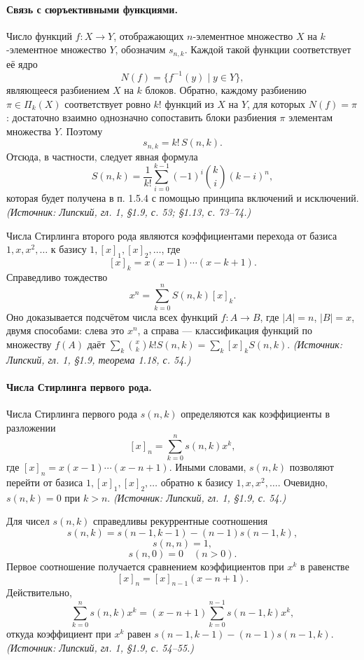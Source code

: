\documentclass[a4paper,12pt]{article}
\begin{document}
\paragraph{Связь с сюръективными функциями.}
Число функций \(f:X\to Y\), отображающих \(n\)-элементное множество \(X\) на \(k\)-элементное множество \(Y\), обозначим \(s_{n,k}\). Каждой такой функции соответствует её ядро
\[
N(f)=\{f^{-1}(y)\mid y\in Y\},
\]
являющееся разбиением \(X\) на \(k\) блоков. Обратно, каждому разбиению \(\pi\in\Pi_k(X)\) соответствует ровно \(k!\) функций из \(X\) на \(Y\), для которых \(N(f)=\pi\): достаточно взаимно однозначно сопоставить блоки разбиения \(\pi\) элементам множества \(Y\). Поэтому
\[
s_{n,k}=k!\,S(n,k).
\]
Отсюда, в частности, следует явная формула
\[
S(n,k)=\frac{1}{k!}\sum_{i=0}^{k-1}(-1)^i\binom{k}{i}(k-i)^n,
\]
которая будет получена в п. 1.5.4 с помощью принципа включений и исключений.
\textit{(Источник: Липский, гл. 1, §1.9, с. 53; §1.13, с. 73--74.)}

Числа Стирлинга второго рода являются коэффициентами перехода от базиса \(1,x,x^2,\dots\) к базису \(1,[x]_1,[x]_2,\dots\), где
\[
[x]_k=x(x-1)\cdots(x-k+1).
\]
Справедливо тождество
\[
x^n=\sum_{k=0}^{n}S(n,k)[x]_k.
\]
Оно доказывается подсчётом числа всех функций \(f:A\to B\), где \(|A|=n\), \(|B|=x\), двумя способами: слева это \(x^n\), а справа — классификация функций по множеству \(f(A)\) даёт \(\sum_k \binom{x}{k}k!S(n,k)=\sum_k [x]_kS(n,k)\).
\textit{(Источник: Липский, гл. 1, §1.9, теорема 1.18, с. 54.)}

\paragraph{Числа Стирлинга первого рода.}
Числа Стирлинга первого рода \(s(n,k)\) определяются как коэффициенты в разложении
\[
[x]_n=\sum_{k=0}^{n}s(n,k)x^k,
\]
где \([x]_n=x(x-1)\cdots(x-n+1)\). Иными словами, \(s(n,k)\) позволяют перейти от базиса \(1,[x]_1,[x]_2,\dots\) обратно к базису \(1,x,x^2,\dots\). Очевидно, \(s(n,k)=0\) при \(k>n\).
\textit{(Источник: Липский, гл. 1, §1.9, с. 54.)}

Для чисел \(s(n,k)\) справедливы рекуррентные соотношения
\[
s(n,k)=s(n-1,k-1)-(n-1)s(n-1,k),
\]
\[
s(n,n)=1,
\]
\[
s(n,0)=0\quad(n>0).
\]
Первое соотношение получается сравнением коэффициентов при \(x^k\) в равенстве
\[
[x]_n=[x]_{n-1}(x-n+1).
\]
Действительно,
\[
\sum_{k=0}^{n}s(n,k)x^k
=
(x-n+1)\sum_{k=0}^{n-1}s(n-1,k)x^k,
\]
откуда коэффициент при \(x^k\) равен \(s(n-1,k-1)-(n-1)s(n-1,k)\).
\textit{(Источник: Липский, гл. 1, §1.9, с. 54--55.)}
\end{document}
